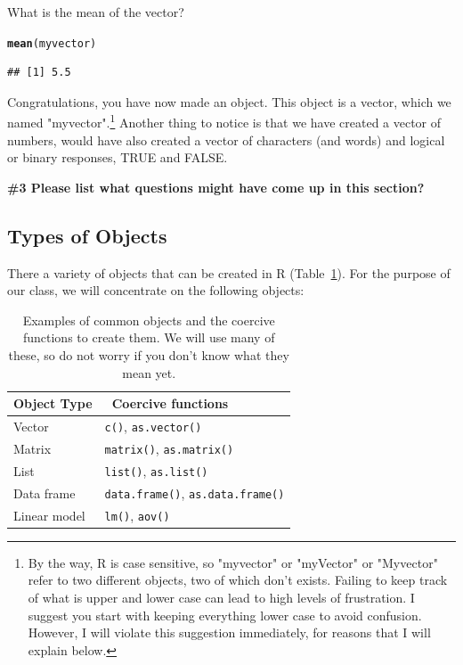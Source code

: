 \documentclass{tufte-handout}\usepackage[]{graphicx}\usepackage[]{xcolor}
\makeatletter
\newcommand{\hlstd}[1]{\textcolor[rgb]{0.345,0.345,0.345}{#1}}%
\newcommand{\hlkwd}[1]{\textcolor[rgb]{0.737,0.353,0.396}{\textbf{#1}}}%
\newenvironment{kframe}{%
 \def\at@end@of@kframe{}%
 \ifinner\ifhmode%
  \def\at@end@of@kframe{\end{minipage}}%
  \begin{minipage}{\columnwidth}%
 \fi\fi%
 \def\FrameCommand##1{\hskip\@totalleftmargin \hskip-\fboxsep
 \colorbox{shadecolor}{##1}\hskip-\fboxsep
     \hskip-\linewidth \hskip-\@totalleftmargin \hskip\columnwidth}%
 \MakeFramed {\advance\hsize-\width
   \@totalleftmargin\z@ \linewidth\hsize
   \@setminipage}}%
 {\par\unskip\endMakeFramed%
 \at@end@of@kframe}
\newenvironment{knitrout}{}{} %
\makeatother
\begin{document}
What is the mean of the vector?

\begin{knitrout}
\color{fgcolor}\begin{kframe}
\begin{alltt}
\hlkwd{mean}\hlstd{(myvector)}
\end{alltt}
\begin{verbatim}
## [1] 5.5
\end{verbatim}
\end{kframe}
\end{knitrout}

Congratulations, you have now made an object. This object is a vector, which we  named "myvector".\footnote{By the way, R is case sensitive, so "myvector" or "myVector" or "Myvector" refer to two different objects, two of which don't exists. Failing to keep track of what is upper and lower case can lead to high levels of frustration. I suggest you start with keeping everything lower case to avoid confusion. However, I will violate this suggestion immediately, for reasons that I will explain below.} Another thing to notice is that we have created a vector of numbers, would have also created a vector of characters (and words) and logical or binary responses, \ie TRUE and FALSE.

\bigskip
\noindent \textbf{\#3 Please list what questions might have come up in this section? }

\subsection{Types of Objects}

There a variety of objects that can be created in R (Table~\ref{tab:CommonObjects}). For the purpose of our class, we will concentrate on the following objects:
\begin{table}
	\centering
		\begin{tabular}{ll}
Object Type &\ Coercive functions \\
\hline
Vector & \texttt{c()}, \texttt{as.vector()} \\
Matrix & \texttt{matrix()}, \texttt{as.matrix()} \\
List & \texttt{list()}, \texttt{as.list()} \\
Data frame & \texttt{data.frame()}, \texttt{as.data.frame()} \\
Linear model & \texttt{lm()}, \texttt{aov()} \\\hline
		\end{tabular}
	\caption{Examples of common objects and the coercive functions to create them. We will use many of these, so do not worry if you don't know what they mean yet.}
	\label{tab:CommonObjects}
\end{table}
\end{document}
